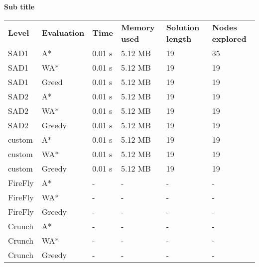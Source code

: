 \documentclass[Main]{subfiles}
\begin{document}
\textbf{Sub title}



\begin{table}[h]
\begin{tabular}{llllll}
\rowcolor[HTML]{EFEFEF} 
\textbf{Level} & \textbf{Evaluation} & \textbf{Time} & \textbf{Memory used} & \textbf{Solution length} & \textbf{Nodes explored} \\
SAD1           & A*                  & 0.01 s        & 5.12 MB              & 19                       & 35                      \\
SAD1           & WA*                 & 0.01 s        & 5.12 MB              & 19                       & 19                      \\
SAD1           & Greed               & 0.01 s        & 5.12 MB              & 19                       & 19                      \\
SAD2           & A*                  & 0.01 s        & 5.12 MB              & 19                       & 19                      \\
SAD2           & WA*                 & 0.01 s        & 5.12 MB              & 19                       & 19                      \\
SAD2           & Greedy              & 0.01 s        & 5.12 MB              & 19                       & 19                      \\
custom         & A*                  & 0.01 s        & 5.12 MB              & 19                       & 19                      \\
custom         & WA*                 & 0.01 s        & 5.12 MB              & 19                       & 19                      \\
custom         & Greedy              & 0.01 s        & 5.12 MB              & 19                       & 19                      \\
FireFly        & A*                  & -           & -                  & -                      & -                     \\
FireFly        & WA*                 & -           & -                  & -                      & -                     \\
FireFly        & Greedy              & -           & -                  & -                      & -                     \\
Crunch         & A*                  & -           & -                  & -                      & -                     \\
Crunch         & WA*                 & -           & -                  & -                      & -                     \\
Crunch         & Greedy              & -           & -                  & -                      & -                     
\end{tabular}
\end{table}
\end{document}
